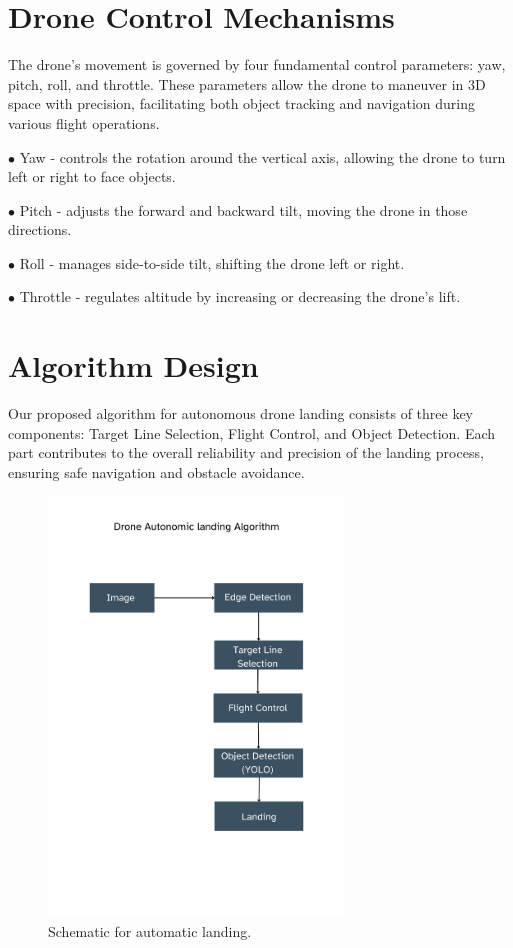 \documentclass[3p,times]{elsarticle}
\begin{document}
\section{Drone Control Mechanisms} \label{sec:mechanisms}
The drone’s movement is governed by four fundamental control parameters: yaw, pitch, roll, and throttle. These parameters allow the drone to maneuver in 3D space with precision, facilitating both object tracking and navigation during various flight operations.\\
\begin{description}
\item $\bullet$ Yaw - controls the rotation around the vertical axis, allowing the drone to turn left or right to face objects.
\item $\bullet$ Pitch - adjusts the forward and backward tilt, moving the drone in those directions.
\item $\bullet$ Roll - manages side-to-side tilt, shifting the drone left or right.
\item $\bullet$ Throttle - regulates altitude by increasing or decreasing the drone’s lift.
\end{description}

\newpage \section{Algorithm Design} \label{sec:algorithm}
Our proposed algorithm for autonomous drone landing consists of three key components: Target Line Selection, Flight Control, and Object Detection. Each part contributes to the overall reliability and precision of the landing process, ensuring safe navigation and obstacle avoidance.

\begin{figure}[H]
    \centering
    \includegraphics[width=0.7\textwidth]{Schematic_for_automatic_landing.png}  %
    \caption{Schematic for automatic landing.}
    \label{fig:Schematic_for_automatic_landing.}
\end{figure}
\end{document}
